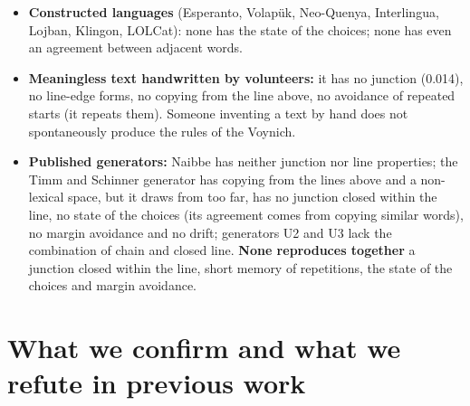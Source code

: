 \begin{itemize}
\item \textbf{Constructed languages} (Esperanto, Volapük, Neo-Quenya, Interlingua, Lojban, Klingon, LOLCat): none has the
  state of the choices; none has even an agreement between adjacent words.
\item \textbf{Meaningless text handwritten by volunteers:} it has no junction (0.014), no line-edge forms, no copying from
  the line above, no avoidance of repeated starts (it repeats them). Someone inventing a text by hand does not
  spontaneously produce the rules of the Voynich.
\item \textbf{Published generators:} Naibbe has neither junction nor line properties; the Timm and Schinner generator has
  copying from the lines above and a non-lexical space, but it draws from too far, has no junction closed within the line,
  no state of the choices (its agreement comes from copying similar words), no margin avoidance and no drift; generators
  U2 and U3 lack the combination of chain and closed line. \textbf{None reproduces together} a junction closed within the
  line, short memory of repetitions, the state of the choices and margin avoidance.
\end{itemize}

\section{What we confirm and what we refute in previous work}

